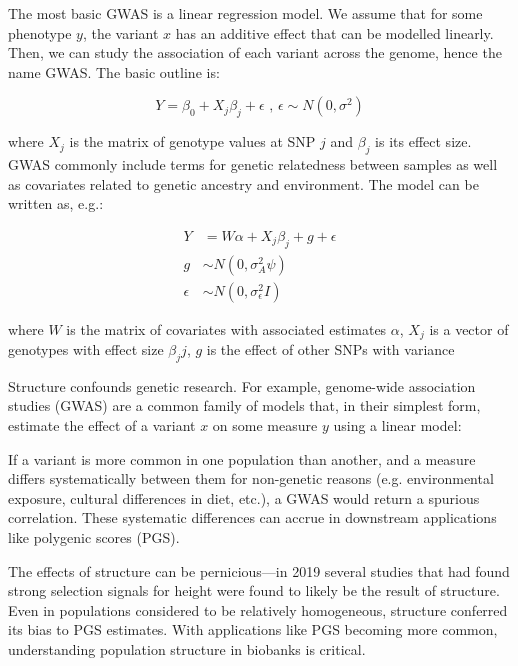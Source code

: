 The most basic GWAS is a linear regression model. We assume that for some phenotype $y$, the variant $x$ has an additive effect that can be modelled linearly. Then, we can study the association of each variant across the genome, hence the name GWAS. The basic outline is:

$$ Y = \beta_0 + X_{j}\beta_{j} + \epsilon \text{ , } \epsilon \sim N(0,\sigma^{2})  $$

where $X_{j}$ is the matrix of genotype values at SNP $j$ and $\beta_{j}$ is its effect size. GWAS commonly include terms for genetic relatedness between samples as well as covariates related to genetic ancestry and environment. The model can be written as, e.g.\citep{uffelmann_genome-wide_2021}:

\begin{spacing}{1}
\begin{align*} 
Y & = W\alpha + X_{j}\beta_{j} + g + \epsilon \\
g & \sim N(0,\sigma^{2}_{A}\psi) \\
\epsilon & \sim N(0,\sigma^{2}_{\epsilon}I)
\end{align*} 
\end{spacing}

where $W$ is the matrix of covariates with associated estimates $\alpha$, $X_{j}$ is a vector of genotypes with effect size $\beta_{j}j$, $g$ is the effect of other SNPs with variance



Structure confounds genetic research. For example, genome-wide association studies (GWAS) are a common family of models that, in their simplest form, estimate the effect of a variant $x$ on some measure $y$ using a linear model:



If a variant is more common in one population than another, and a measure differs systematically between them for non-genetic reasons (e.g. environmental exposure, cultural differences in diet, etc.), a GWAS would return a spurious correlation\citep{price_principal_2006}. These systematic differences can accrue in downstream applications like polygenic scores (PGS)\citep{zaidi_demographic_2020}. 


The effects of structure can be pernicious---in 2019 several studies that had found strong selection signals for height were found to likely be the result of structure\citep{berg_reduced_2019}. Even in populations considered to be relatively homogeneous, structure conferred its bias to PGS estimates\citep{kerminen_geographic_2019}. With applications like PGS becoming more common, understanding population structure in biobanks is critical\citep{kaplan_polygenic_2022}.

